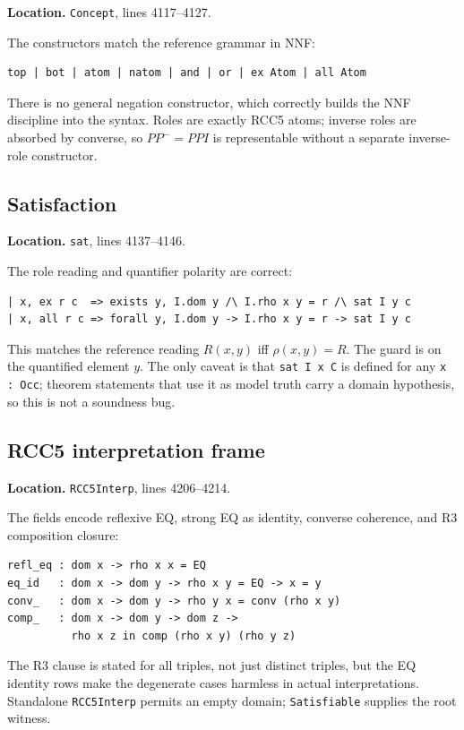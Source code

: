 \documentclass[11pt]{article}
\begin{document}
\textbf{Location.} \texttt{Concept}, lines 4117--4127.

The constructors match the reference grammar in NNF:
\begin{lstlisting}
top | bot | atom | natom | and | or | ex Atom | all Atom
\end{lstlisting}
There is no general negation constructor, which correctly builds the NNF
discipline into the syntax.  Roles are exactly RCC5 atoms; inverse roles are
absorbed by converse, so \(PP^{-}=PPI\) is representable without a separate
inverse-role constructor.

\subsection{Satisfaction}

\textbf{Location.} \texttt{sat}, lines 4137--4146.

The role reading and quantifier polarity are correct:
\begin{lstlisting}
| x, ex r c  => exists y, I.dom y /\ I.rho x y = r /\ sat I y c
| x, all r c => forall y, I.dom y -> I.rho x y = r -> sat I y c
\end{lstlisting}
This matches the reference reading \(R(x,y)\) iff \(\rho(x,y)=R\).  The guard
is on the quantified element \(y\).  The only caveat is that \texttt{sat I x C}
is defined for any \texttt{x : Occ}; theorem statements that use it as model
truth carry a domain hypothesis, so this is not a soundness bug.

\subsection{RCC5 interpretation frame}

\textbf{Location.} \texttt{RCC5Interp}, lines 4206--4214.

The fields encode reflexive EQ, strong EQ as identity, converse coherence, and
R3 composition closure:
\begin{lstlisting}
refl_eq : dom x -> rho x x = EQ
eq_id   : dom x -> dom y -> rho x y = EQ -> x = y
conv_   : dom x -> dom y -> rho y x = conv (rho x y)
comp_   : dom x -> dom y -> dom z ->
          rho x z in comp (rho x y) (rho y z)
\end{lstlisting}
The R3 clause is stated for all triples, not just distinct triples, but the EQ
identity rows make the degenerate cases harmless in actual interpretations.
Standalone \texttt{RCC5Interp} permits an empty domain; \texttt{Satisfiable}
supplies the root witness.
\end{document}
